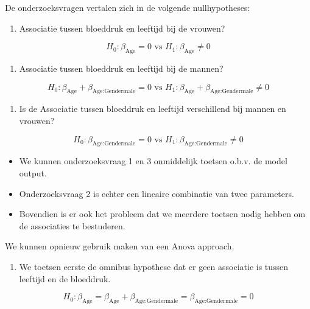 \documentclass[
  12pt,dutch,coursenotes]{book}
\providecommand{\tightlist}{%
  \setlength{\itemsep}{0pt}\setlength{\parskip}{0pt}}
\theoremstyle{definition}
\theoremstyle{definition}
\theoremstyle{definition}
\theoremstyle{definition}
\theoremstyle{remark}
\begin{document}
De onderzoeksvragen vertalen zich in de volgende nullhypotheses:

\begin{enumerate}
\def\labelenumi{\arabic{enumi}.}
\tightlist
\item
  Associatie tussen bloeddruk en leeftijd bij de vrouwen?
\end{enumerate}

\[
H_0: \beta_\text{Age} = 0 \text{ vs } H_1: \beta_\text{Age} \neq 0
\]

\begin{enumerate}
\def\labelenumi{\arabic{enumi}.}
\setcounter{enumi}{1}
\tightlist
\item
  Associatie tussen bloeddruk en leeftijd bij de mannen?
\end{enumerate}

\[
H_0: \beta_\text{Age} + \beta_\text{Age:Gendermale} = 0 \text{ vs } H_1: \beta_\text{Age} + \beta_\text{Age:Gendermale} \neq 0
\]

\begin{enumerate}
\def\labelenumi{\arabic{enumi}.}
\setcounter{enumi}{2}
\tightlist
\item
  Is de Associatie tussen bloeddruk en leeftijd verschillend bij mannen en vrouwen?
\end{enumerate}

\[H_0: \beta_\text{Age:Gendermale} = 0 \text{ vs } H_1: \beta_\text{Age:Gendermale} \neq 0
\]

\begin{itemize}
\tightlist
\item
  We kunnen onderzoeksvraag 1 en 3 onmiddelijk toetsen o.b.v. de model output.
\item
  Onderzoeksvraag 2 is echter een lineaire combinatie van twee parameters.
\item
  Bovendien is er ook het probleem dat we meerdere toetsen nodig hebben om de associaties te bestuderen.
\end{itemize}

We kunnen opnieuw gebruik maken van een Anova approach.

\begin{enumerate}
\def\labelenumi{\arabic{enumi}.}
\tightlist
\item
  We toetsen eerste de omnibus hypothese dat er geen associatie is tussen leeftijd en de bloeddruk.
\end{enumerate}

\[
H_0: \beta_\text{Age} = \beta_\text{Age} + \beta_\text{Age:Gendermale} = \beta_\text{Age:Gendermale} = 0
\]
\end{document}
